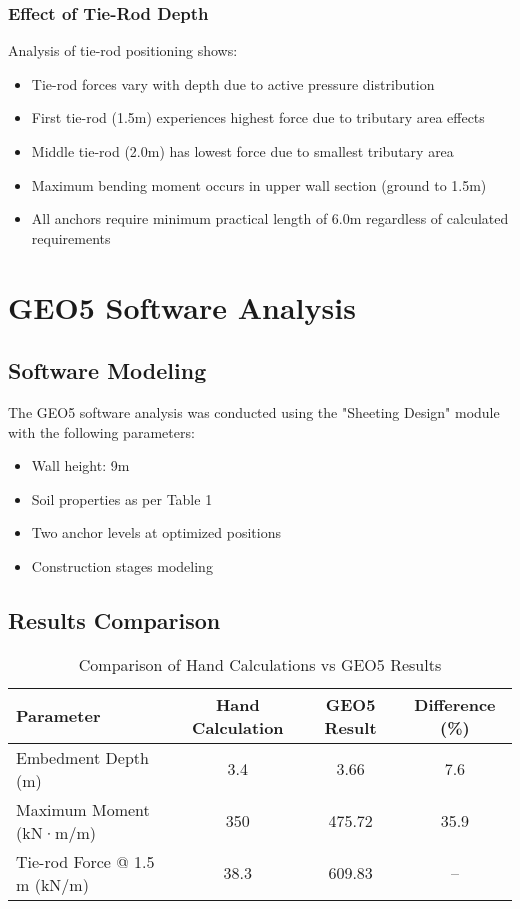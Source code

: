 \documentclass[10pt,a4paper,twocolumn]{article}
\begin{document}
\subsubsection{Effect of Tie-Rod Depth}
Analysis of tie-rod positioning shows:
\begin{itemize}
\item Tie-rod forces vary with depth due to active pressure distribution
\item First tie-rod (1.5m) experiences highest force due to tributary area effects
\item Middle tie-rod (2.0m) has lowest force due to smallest tributary area
\item Maximum bending moment occurs in upper wall section (ground to 1.5m)
\item All anchors require minimum practical length of 6.0m regardless of calculated requirements
\end{itemize}

\newpage

\section{GEO5 Software Analysis}

\subsection{Software Modeling}

The GEO5 software analysis was conducted using the "Sheeting Design" module with the following parameters:
\begin{itemize}
\item Wall height: 9m
\item Soil properties as per Table 1
\item Two anchor levels at optimized positions
\item Construction stages modeling
\end{itemize}

\subsection{Results Comparison}

\begin{table*}[t]  %
  \centering
  \caption{Comparison of Hand Calculations vs GEO5 Results}
  \label{tab:comparison}
  \begin{tabular}{|l|c|c|c|}
    \hline
    \textbf{Parameter} & \textbf{Hand Calculation} & \textbf{GEO5 Result} & \textbf{Difference (\%)} \\
    \hline
    Embedment Depth (m)         & 3.4   & 3.66   & 7.6   \\
    Maximum Moment (kN·m/m)     & 350   & 475.72 & 35.9  \\
    Tie-rod Force @ 1.5 m (kN/m)& 38.3  & 609.83 & –     \\
    \hline
  \end{tabular}
\end{table*}
\end{document}
